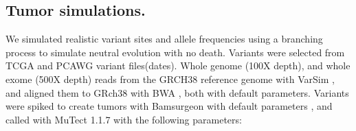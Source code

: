 \documentclass[a4,center,fleqn]{NAR}
\newcommand{\bkmcomment}[1]{{\color{blue}BKM: #1}}
\begin{document}






\subsection{Tumor simulations.}

We simulated realistic variant sites and allele frequencies using a branching process to simulate neutral evolution with no death.
Variants were selected from TCGA and PCAWG variant files(dates).
Whole genome (100X depth), and whole exome (500X depth) reads from the GRCH38 reference genome with VarSim \cite{Mu2015}, and aligned them to GRch38 with BWA \cite{Li2009a}, both with default parameters.
Variants were spiked to create tumors with Bamsurgeon with default parameters \cite{Ewing2015a},
and called with MuTect 1.1.7 \cite{Cibulskis2013} with the following parameters:
\end{document}
